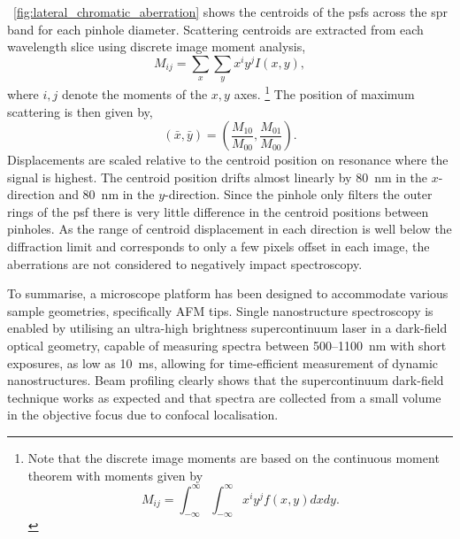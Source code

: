 \documentclass{article}
\begin{document}
\figurename~\ref{fig:lateral_chromatic_aberration} shows the centroids of the \glspl{psf} across the \gls{spr} band for each pinhole diameter. Scattering centroids are extracted from each wavelength slice using discrete image moment analysis,
\begin{equation}
	M_{ij} = \sum_x \sum_y x^i y^j I(x,y),
	\label{eq:image_moments}
\end{equation}
where $i,j$ denote the moments of the $x,y$ axes.%
\footnote{Note that the discrete image moments are based on the continuous moment theorem with moments given by $$M_{ij} = \int_{-\infty}^{\infty} \int_{-\infty}^{\infty} x^i y^j f(x,y) dx dy.$$}
The position of maximum scattering is then given by,
\begin{equation}
	(\bar{x},\bar{y}) = \left( \frac{M_{10}}{M_{00}}, \frac{M_{01}}{M_{00}} \right).
	\label{eq:centroid_position}
\end{equation}
Displacements are scaled relative to the centroid position on resonance where the signal is highest. The centroid position drifts almost linearly by \SI{80}{nm} in the $x$-direction and \SI{80}{nm} in the $y$-direction. Since the pinhole only filters the outer rings of the \gls{psf} there is very little difference in the centroid positions between pinholes. As the range of centroid displacement in each direction is well below the diffraction limit and corresponds to only a few pixels offset in each image, the aberrations are not considered to negatively impact spectroscopy. %

To summarise, a microscope platform has been designed to accommodate various sample geometries, specifically AFM tips. Single nanostructure spectroscopy is enabled by utilising an ultra-high brightness supercontinuum laser in a dark-field optical geometry, capable of measuring spectra between 500--\SI{1100}{nm} with short exposures, as low as \SI{10}{ms}, allowing for time-efficient measurement of dynamic nanostructures. Beam profiling clearly shows that the supercontinuum dark-field technique works as expected and that spectra are collected from a small volume in the objective focus due to confocal localisation.

\FloatBarrier
\end{document}
